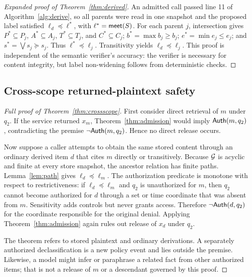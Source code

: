 \begin{proof}[Expanded proof of Theorem~\ref{thm:derived}]
An admitted call passed line 11 of Algorithm~\ref{alg:derive}, so all parents were read in one snapshot and the proposed label satisfied $\ell_d\preceq\ell^*$, with $\ell^*=\mathsf{meet}(S)$. For each parent $j$, intersection gives $P^*\subseteq P_j$, $A^*\subseteq A_j$, $T^*\subseteq T_j$, and $C^*\subseteq C_j$; $b^*=\max b_j\ge b_j$; $e^*=\min e_j\le e_j$; and $s^*=\bigvee s_j\succeq s_j$. Thus $\ell^*\preceq\ell_j$. Transitivity yields $\ell_d\preceq\ell_j$. This proof is independent of the semantic verifier's accuracy: the verifier is necessary for content integrity, but label non-widening follows from deterministic checks.
\end{proof}

\subsection{Cross-scope returned-plaintext safety}
\label{app:proof-crossscope}

\begin{proof}[Full proof of Theorem~\ref{thm:crossscope}]
First consider direct retrieval of $m$ under $q_2$. If the service returned $x_m$, Theorem~\ref{thm:admission} would imply $\mathsf{Auth}(m,q_2)$, contradicting the premise $\neg\mathsf{Auth}(m,q_2)$. Hence no direct release occurs.

Now suppose a caller attempts to obtain the same stored content through an ordinary derived item $d$ that cites $m$ directly or transitively. Because $\mathcal{G}$ is acyclic and finite at every store snapshot, the ancestor relation has finite paths. Lemma~\ref{lem:path} gives $\ell_d\preceq\ell_m$. The authorization predicate is monotone with respect to restrictiveness: if $\ell_d\preceq\ell_m$ and $q_2$ is unauthorized for $m$, then $q_2$ cannot become authorized for $d$ through a set or time coordinate that was absent from $m$. Sensitivity adds controls but never grants access. Therefore $\neg\mathsf{Auth}(d,q_2)$ for the coordinate responsible for the original denial. Applying Theorem~\ref{thm:admission} again rules out release of $x_d$ under $q_2$.

The theorem refers to stored plaintext and ordinary derivations. A separately authorized declassification is a new policy event and lies outside the premise. Likewise, a model might infer or paraphrase a related fact from other authorized items; that is not a release of $m$ or a descendant governed by this proof.
\end{proof}

